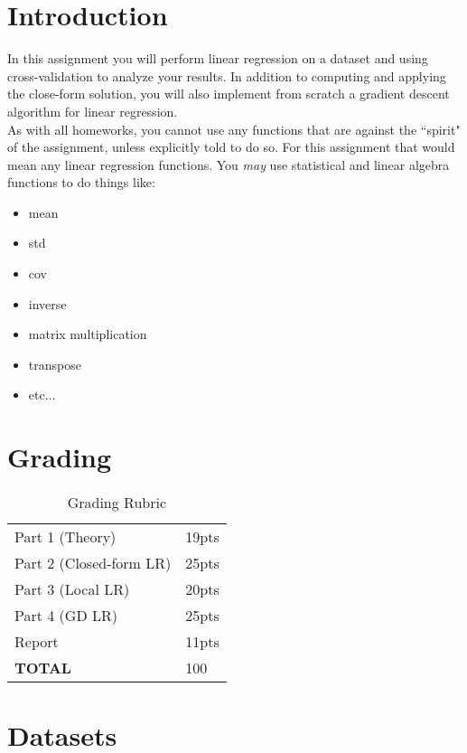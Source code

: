 \documentclass[12pt]{article}
\begin{document}
\maketitle


\section*{Introduction}
In this assignment you will perform linear regression on a dataset and using cross-validation to analyze your results.  In addition to computing and applying the close-form solution, you will also implement from scratch a gradient descent algorithm for linear regression.\\

\noindent
As with all homeworks, you cannot use any functions that are against the ``spirit" of the assignment, unless explicitly told to do so.  For this assignment that would mean any linear regression functions.   You \emph{may} use statistical and linear algebra functions to do things like:
\begin{itemize}
\item mean
\item std
\item cov
\item inverse
\item matrix multiplication
\item transpose
\item etc...
\end{itemize}


\section*{Grading}
\begin{table}[h]
\begin{center}
\begin{tabular}{|l|l|}
\hline
Part 1 (Theory) & 19pts\\
Part 2 (Closed-form LR) & 25pts\\
Part 3 (Local LR) & 20pts\\
Part 4 (GD LR) & 25pts\\
Report & 11pts\\
\hline
\textbf{TOTAL} & 100 \\
\hline
\end{tabular}
\caption{Grading Rubric}
\end{center}
\end{table}

\newpage
\section*{Datasets}
\end{document}
